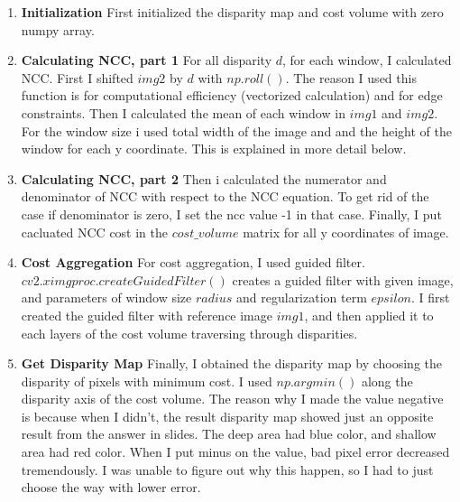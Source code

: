 \begin{enumerate}
    \item \textbf{Initialization} First initialized the disparity map and cost volume with zero numpy array. 
    \item \textbf{Calculating NCC, part 1} For all disparity $d$, for each window, I calculated NCC. First I shifted $img2$ by $d$ with $np.roll()$. The reason I used this function is for computational efficiency (vectorized calculation) and for edge constraints. 
    Then I calculated the mean of each window in $img1$ and $img2$. For the window size i used total width of the image and and the height of the window for each y coordinate. This is explained in more detail below.
    \item \textbf{Calculating NCC, part 2} Then i calculated the numerator and denominator of NCC with respect to the NCC equation. To get rid of the case if denominator is zero, I set the ncc value -1 in that case. Finally, I put cacluated NCC cost in the $cost\_volume$ matrix for all y coordinates of image.
    \item \textbf{Cost Aggregation} For cost aggregation, I used guided filter. $cv2.ximgproc.createGuidedFilter()$ creates a guided filter with given image, and parameters of window size $radius$ and regularization term $epsilon$. I first created the guided filter with reference image $img1$, and then applied it to each layers of the cost volume traversing through disparities.
    \item \textbf{Get Disparity Map} Finally, I obtained the disparity map by choosing the disparity of pixels with minimum cost. I used $np.argmin()$ along the disparity axis of the cost volume. The reason why I made the value negative is because when I didn't, the result disparity map showed just an opposite result from the answer in slides. The deep area had blue color, and shallow area had red color. When I put minus on the value, bad pixel error decreased tremendously. I was unable to figure out why this happen, so I had to just choose the way with lower error. 
\end{enumerate}

